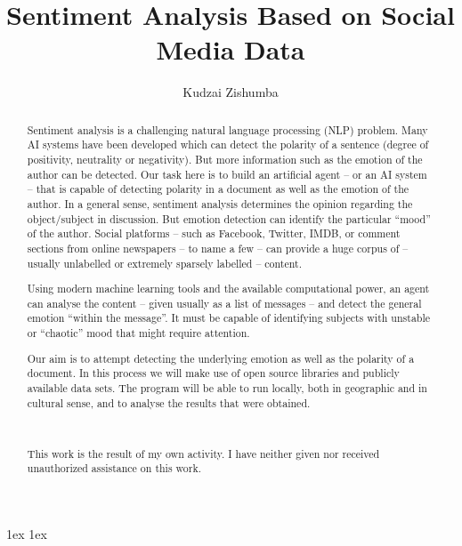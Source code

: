 \documentclass[final,a4paper]{aust_thesis}
\title{%
Sentiment Analysis Based on Social Media Data
}
\author{%
Kudzai Zishumba
}
\begin{document}
\begin{abstract}%

Sentiment analysis is a challenging natural language processing (NLP) problem.
%
Many AI systems have been developed which can detect the polarity of a sentence (degree of positivity, neutrality or negativity). But more information such as the emotion of the author can be detected.
Our task here is to build an artificial agent -- or an AI system -- that is capable of detecting polarity in a document as well as the emotion of the author.
%
In a general sense, sentiment analysis determines the opinion regarding the object/subject in discussion.
%
But emotion detection can identify the particular ``mood'' of the author.
%
Social platforms -- such as Facebook, Twitter, IMDB, or comment sections from online newspapers -- to name a few -- can provide a huge corpus of -- usually unlabelled or extremely sparsely labelled -- content.

Using modern machine learning tools and the available computational power, an agent can analyse the content -- given usually as a list of messages -- and detect the general emotion ``within the message''.
%
It must be capable of identifying subjects with unstable or ``chaotic'' mood that might require attention.

Our aim is to attempt detecting the underlying emotion as well as the polarity of a document.
%
In this process we will make use of open source libraries and publicly available data sets.
%
The program will be able to run locally, both in geographic and in cultural sense, and to analyse the results that were obtained.

~

This work is the result of my own activity. I have neither given nor received unauthorized assistance on this work.

\end{abstract}

\maketitle


{ \baselineskip 1ex
  \parskip 1ex
  \tableofcontents
}











\appendix



{ \renewcommand{\baselinestretch}{0.8}\normalsize %
  \setlength{\itemsep}{-2.4mm}
  \setlength{\bibspacing}{0.67\baselineskip}
  
  
}
\end{document}
